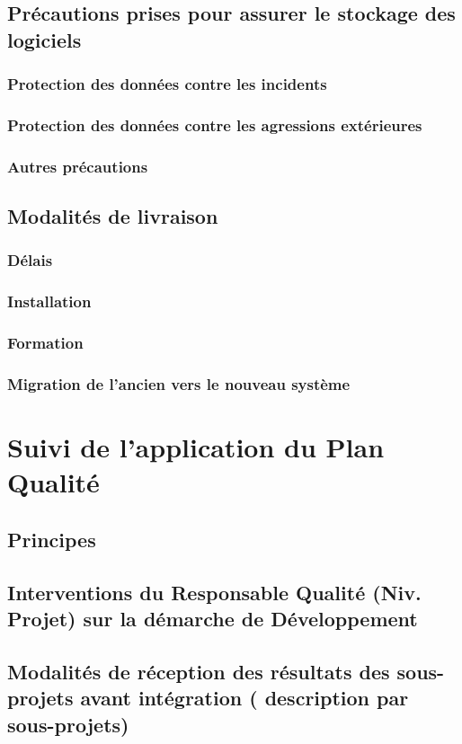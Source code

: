 \subsection{Précautions prises pour assurer le stockage des logiciels}
\subsubsection{Protection des données contre les incidents}
\subsubsection{Protection des données contre les agressions extérieures}
\subsubsection{Autres précautions}
\subsection{Modalités de livraison}
\subsubsection{Délais}
\subsubsection{Installation}
\subsubsection{Formation}
\subsubsection{Migration de l’ancien vers le nouveau système}

\section{Suivi de l’application du Plan Qualité}
\subsection{Principes}
\subsection{Interventions du Responsable Qualité (Niv. Projet) sur la démarche de Développement}
\subsection{Modalités de réception des résultats des sous-projets avant intégration	( description par sous-projets)}

